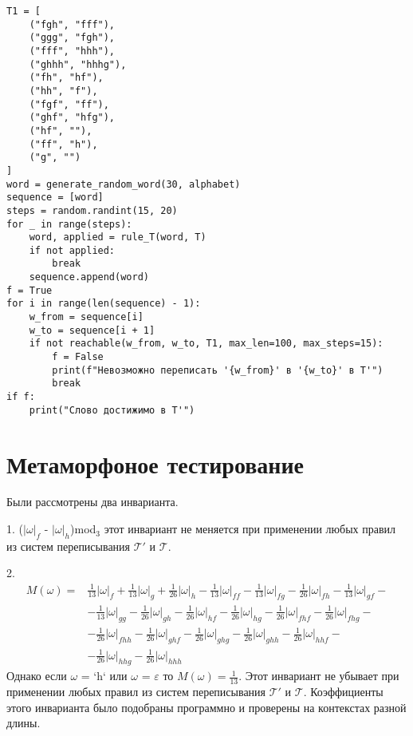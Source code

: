 \documentclass[a4paper, 14pt]{extarticle}
\begin{document}
\begin{lstlisting}
T1 = [
    ("fgh", "fff"),
    ("ggg", "fgh"),
    ("fff", "hhh"),
    ("ghhh", "hhhg"),
    ("fh", "hf"),
    ("hh", "f"),
    ("fgf", "ff"),
    ("ghf", "hfg"),
    ("hf", ""),
    ("ff", "h"),
    ("g", "")
]
word = generate_random_word(30, alphabet)
sequence = [word]
steps = random.randint(15, 20)
for _ in range(steps):
    word, applied = rule_T(word, T)
    if not applied:
        break
    sequence.append(word)
f = True
for i in range(len(sequence) - 1):
    w_from = sequence[i]
    w_to = sequence[i + 1]
    if not reachable(w_from, w_to, T1, max_len=100, max_steps=15):
        f = False
        print(f"Невозможно переписать '{w_from}' в '{w_to}' в T'")
        break
if f:
    print("Слово достижимо в T'")
\end{lstlisting}

\section{Метаморфоное тестирование}
Были рассмотрены два инварианта.

1. ($|\omega|_f$ - $|\omega|_h$)mod$_3$ этот инвариант не меняется при применении любых правил из систем переписывания $\mathcal{T}'$ и $\mathcal{T}$.

2. \[
\begin{aligned}
M(\omega) ={} & \frac{1}{13}|\omega|_f + \frac{1}{13}|\omega|_g + \frac{1}{26}|\omega|_h - \frac{1}{13}|\omega|_{ff} - \frac{1}{13}|\omega|_{fg} - \frac{1}{26}|\omega|_{fh} - \frac{1}{13}|\omega|_{gf} - \\
&- \frac{1}{13}|\omega|_{gg} - \frac{1}{26}|\omega|_{gh} - \frac{1}{26}|\omega|_{hf} - \frac{1}{26}|\omega|_{hg} - \frac{1}{26}|\omega|_{fhf} - \frac{1}{26}|\omega|_{fhg} - \\
&- \frac{1}{26}|\omega|_{fhh} - \frac{1}{26}|\omega|_{ghf} - \frac{1}{26}|\omega|_{ghg} - \frac{1}{26}|\omega|_{ghh} - \frac{1}{26}|\omega|_{hhf} - \\
&- \frac{1}{26}|\omega|_{hhg} - \frac{1}{26}|\omega|_{hhh}
\end{aligned} 
\]
Однако если $\omega$ = `h` или $\omega$ = $\varepsilon$ то $M(\omega) = \frac{1}{13}$.
Этот инвариант не убывает при применении любых правил из систем переписывания $\mathcal{T}'$ и $\mathcal{T}$. Коэффициенты этого инварианта было подобраны программно и проверены на контекстах разной длины.
\end{document}

